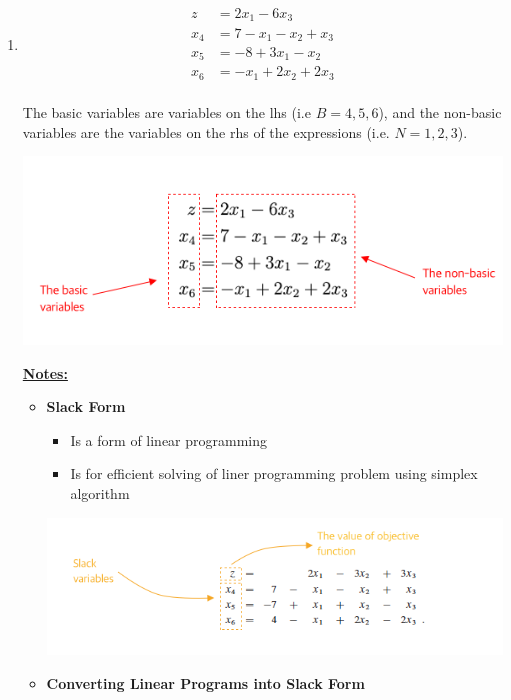 \documentclass[12pt]{article}
\begin{document}
\begin{enumerate}[1.]
    \item

    \begin{align*}
        z &= 2x_1 - 6x_3\\
        x_4 &= 7 - x_1 - x_2 + x_3\\
        x_5 &= -8 + 3x_1 - x_2\\
        x_6 &= -x_1 + 2x_2 + 2x_3\\
    \end{align*}

    \bigskip

    The basic variables are variables on the lhs (i.e $B = {4,5,6}$), and the non-basic variables are the
    variables on the rhs of the expressions (i.e. $N = {1,2,3}$).

    \begin{center}
    \includegraphics[width=0.7\linewidth]{images/worksheet_6_solution_12.png}
    \end{center}

    \bigskip

    \underline{\textbf{Notes:}}

    \bigskip

    \begin{itemize}

        \item \textbf{Slack Form}

        \begin{itemize}
            \item Is a form of linear programming
            \item Is for efficient solving of liner programming problem using simplex algorithm
        \end{itemize}

        \begin{center}
        \includegraphics[width=\linewidth]{images/worksheet_6_solution_6.png}
        \end{center}
        \item \textbf{Converting Linear Programs into Slack Form}


\end{itemize}
\end{enumerate}
\end{document}
